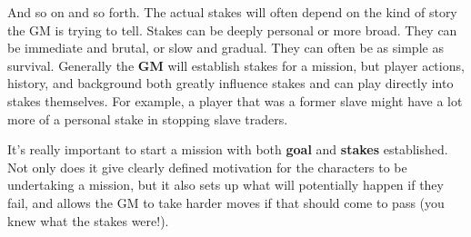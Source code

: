 And so on and so forth. The actual stakes will often depend on the kind of story the GM is trying to tell. Stakes can be deeply personal or more broad. They can be immediate and brutal, or slow and gradual. They can often be as simple as survival. Generally the \textbf{GM} will establish stakes for a mission, but player actions, history, and background both greatly influence stakes and can play directly into stakes themselves. For example, a player that was a former slave might have a lot more of a personal stake in stopping slave traders.

It's really important to start a mission with both \textbf{goal} and \textbf{stakes} established. Not only does it give clearly defined motivation for the characters to be undertaking a mission, but it also sets up what will potentially happen if they fail, and allows the GM to take harder moves if that should come to pass (you knew what the stakes were!).